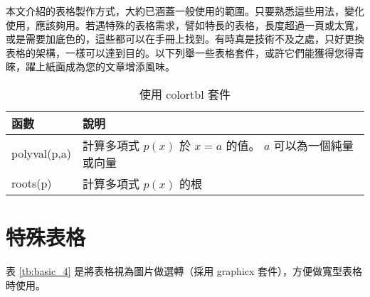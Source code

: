 \documentclass[12pt, a4paper]{article}
\begin{document}
本文介紹的表格製作方式，大約已涵蓋一般使用的範圍。只要熟悉這些用法，變化使用，應該夠用。若遇特殊的表格需求，譬如特長的表格，長度超過一頁或太寬，或是需要加底色的，這些都可以在手冊上找到。有時真是技術不及之處，只好更換表格的架構，一樣可以達到目的。以下列舉一些表格套件，或許它們能獲得您得青睞，躍上紙面成為您的文章增添風味。

\begin{table}[h]
\begin{center}
\caption{使用 {\A colortbl} 套件}\label{tb:b}
\extrarowheight=4pt
\begin{tabular}{ll}
\rowcolor[gray]{.9}
函數			&	說明\\
\toprule
polyval(p,a)	&	計算多項式 $p(x)$ 於 $x=a$ 的值。 $a$ 可以為一個純量或向量\\
roots(p)		&	計算多項式 $p(x)$ 的根\\
\bottomrule
\end{tabular}
\end{center}
\vspace{1cm}
\end{table}


\section{特殊表格}
表 \ref{tb:basic_4} 是將表格視為圖片做選轉（採用  {\A graphicx} 套件），方便做寬型表格時使用。
\begin{table}[h]
\begin{center}
\caption{旋轉表格}\label{tb:basic_4}
\extrarowheight=6pt
\hspace{10pt}
\extrarowheight=6pt
\end{center}
\end{table}
\end{document}
